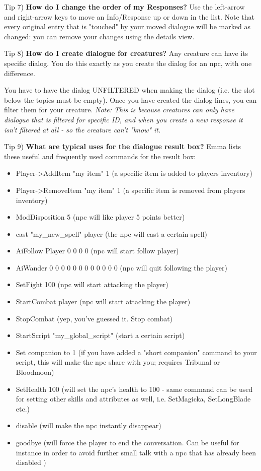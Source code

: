 Tip 7) \textbf{How do I change the order of my Responses?} Use the
left-arrow and right-arrow keys to move an Info/Response up or down in
the list. Note that every original entry that is "touched" by your moved
dialogue will be marked as changed: you can remove your changes using
the details view.

Tip 8) \textbf{How do I create dialogue for creatures?} Any creature can
have its specific dialog. You do this exactly as you create the dialog
for an npc, with one difference.

You have to have the dialog UNFILTERED when making the dialog (i.e. the
slot below the topics must be empty). Once you have created the dialog
lines, you can filter them for your creature. \emph{Note: This is
because creatures can only have dialogue that is filtered for specific
ID, and when you create a new response it isn't filtered at all - so the
creature can't "know" it.}

Tip 9) \textbf{What are typical uses for the dialogue result box?} Emma
lists these useful and frequently used commands for the result box:

\begin{itemize}
\item
  Player-\textgreater AddItem "my item" 1 (a specific item is added to
  players inventory)
\item
  Player-\textgreater RemoveItem "my item" 1 (a specific item is removed
  from players inventory)
\item
  ModDisposition 5 (npc will like player 5 points better)
\item
  cast "my\_new\_spell" player (the npc will cast a certain spell)
\item
  AiFollow Player 0 0 0 0 (npc will start follow player)
\item
  AiWander 0 0 0 0 0 0 0 0 0 0 0 0 (npc will quit following the player)
\item
  SetFight 100 (npc will start attacking the player)
\item
  StartCombat player (npc will start attacking the player)
\item
  StopCombat (yep, you've guessed it. Stop combat)
\item
  StartScript "my\_global\_script" (start a certain script)
\item
  Set companion to 1 (if you have added a "short companion" command to
  your script, this will make the npc share with you; requires Tribunal
  or Bloodmoon)
\item
  SetHealth 100 (will set the npc's health to 100 - same command can be
  used for setting other skills and attributes as well, i.e. SetMagicka,
  SetLongBlade etc.)
\item
  disable (will make the npc instantly disappear)
\item
  goodbye (will force the player to end the conversation. Can be useful
  for instance in order to avoid further small talk with a npc that has
  already been disabled )
\end{itemize}

